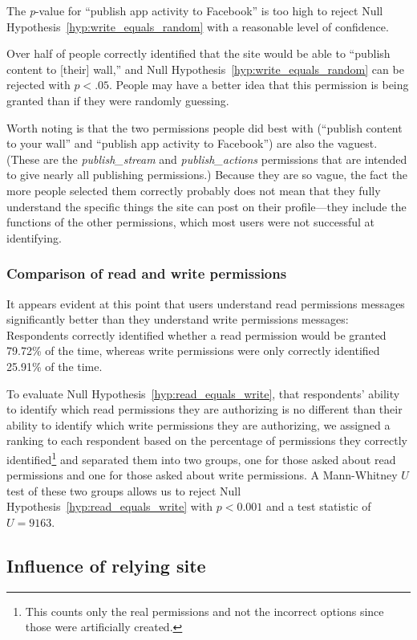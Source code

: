 \documentclass{sig-alternate}
\begin{document}
The \emph{p}-value for ``publish app activity to Facebook'' is too high to reject Null Hypothesis~\ref{hyp:write_equals_random} with a reasonable level of confidence. 

Over half of people correctly identified that the site would be able to ``publish content to [their] wall,'' and Null Hypothesis~\ref{hyp:write_equals_random} can be rejected with $p < .05$. People may have a better idea that this permission is being granted than if they were randomly guessing. 

Worth noting is that the two permissions people did best with (``publish content to your wall'' and ``publish app activity to Facebook'') are also the vaguest. (These are the \emph{publish\_stream} and \emph{publish\_actions} permissions that are intended to give nearly all publishing permissions.) Because they are so vague, the fact the more people selected them correctly probably does not mean that they fully understand the specific things the site can post on their profile---they include the functions of the other permissions, which most users were not successful at identifying.

\subsubsection{Comparison of read and write permissions}

It appears evident at this point that users understand read permissions messages significantly better than they understand write permissions messages: Respondents correctly identified whether a read permission would be granted 79.72\% of the time, whereas write permissions were only correctly identified 25.91\% of the time.

To evaluate Null Hypothesis~\ref{hyp:read_equals_write}, that respondents' ability to identify which read permissions they are authorizing is no different than their ability to identify which write permissions they are authorizing, we assigned a ranking to each respondent based on the percentage of permissions they correctly identified\footnote{This counts only the real permissions and not the incorrect options since those were artificially created.} and separated them into two groups, one for those asked about read permissions and one for those asked about write permissions.  A Mann-Whitney $U$ test of these two groups allows us to reject Null Hypothesis~\ref{hyp:read_equals_write} with $p < 0.001$ and a test statistic of $U=9163$.

\subsection{Influence of relying site}
\label{sec:multisite}
\end{document}
